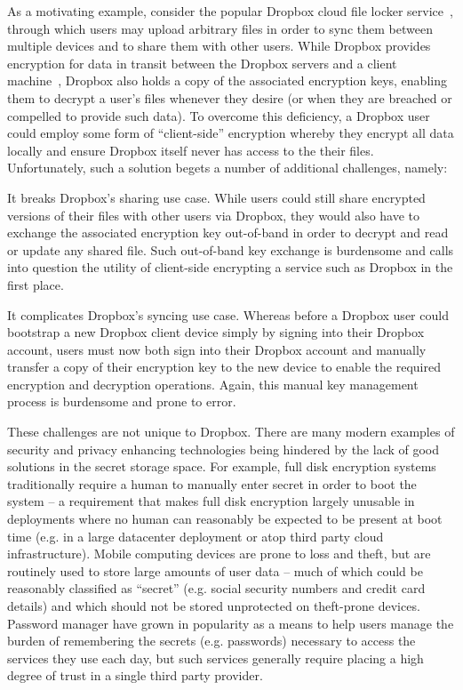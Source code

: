 As a motivating example, consider the popular Dropbox cloud file
locker service~\cite{dropbox}, through which users may upload
arbitrary files in order to sync them between multiple devices and to
share them with other users. While Dropbox provides encryption for
data in transit between the Dropbox servers and a client
machine~\cite{dropbox-security}, Dropbox also holds a copy of the
associated encryption keys, enabling them to decrypt a user's files
whenever they desire (or when they are breached or compelled to
provide such data). To overcome this deficiency, a Dropbox user could
employ some form of ``client-side'' encryption whereby they encrypt
all data locally and ensure Dropbox itself never has access to the
their files. Unfortunately, such a solution begets a number of
additional challenges, namely:

\begin{packed_enum}
\item It breaks Dropbox's sharing use case. While users could still
  share encrypted versions of their files with other users via
  Dropbox, they would also have to exchange the associated encryption
  key out-of-band in order to decrypt and read or update any shared
  file. Such out-of-band key exchange is burdensome and calls into
  question the utility of client-side encrypting a service such as
  Dropbox in the first place.
\item It complicates Dropbox's syncing use case. Whereas before a
  Dropbox user could bootstrap a new Dropbox client device simply by
  signing into their Dropbox account, users must now both sign into
  their Dropbox account and manually transfer a copy of their
  encryption key to the new device to enable the required encryption
  and decryption operations. Again, this manual key management process
  is burdensome and prone to error.
\end{packed_enum}

These challenges are not unique to Dropbox. There are many modern
examples of security and privacy enhancing technologies being hindered
by the lack of good solutions in the secret storage space. For
example, full disk encryption systems traditionally require a human to
manually enter secret in order to boot the system -- a requirement
that makes full disk encryption largely unusable in deployments where
no human can reasonably be expected to be present at boot time
(e.g. in a large datacenter deployment or atop third party cloud
infrastructure). Mobile computing devices are prone to loss and theft,
but are routinely used to store large amounts of user data -- much of
which could be reasonably classified as ``secret'' (e.g. social
security numbers and credit card details) and which should not be
stored unprotected on theft-prone devices. Password manager have grown
in popularity as a means to help users manage the burden of
remembering the secrets (e.g. passwords) necessary to access the
services they use each day, but such services generally require
placing a high degree of trust in a single third party provider.

